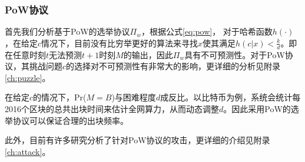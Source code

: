 \subsubsection{PoW协议}

首先我们分析基于PoW的选举协议$\Pi_w$，根据公式\ref{eq:pow}，
对于哈希函数$h(\cdot)$，在给定$c$情况下，目前没有比穷举更好的算法来寻找$x$使其满足$h(c|x)<\frac{k}{d}$\cite{gilbert2003security}。即在任意时刻$t$无法预测$t+1$时刻$M$的输出，因此$\Pi_w$具有不可预测性。对于PoW协议，其挑战问题$c$的选择对不可预测性有非常大的影响，更详细的分析见附录\ref{ch:puzzle}。


在给定$c$的情况下，Pr($M=B$)与困难程度$d$成反比。以比特币为例，系统会统计每2016个区块的总共出块时间来估计全网算力，从而动态调整$d$。因此采用PoW的选举协议可以保证合理的出块频率。

此外，目前有许多研究分析了针对PoW协议的攻击，更详细的介绍见附录\ref{ch:attack}。






